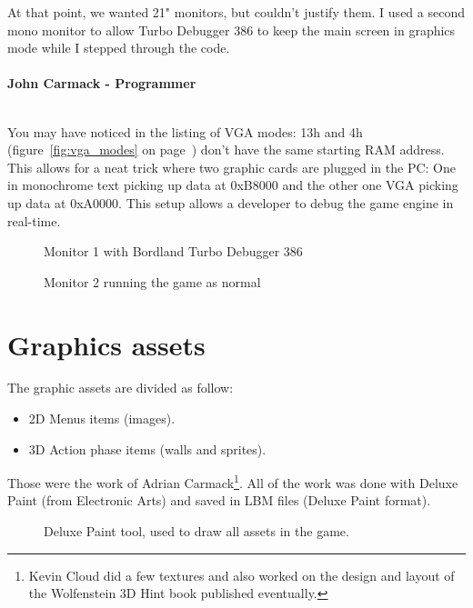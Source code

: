 \documentclass[book.tex]{subfiles}
\begin{document}
\begin{fancyquotes}
At that point, we wanted 21" monitors, but couldn't justify them.  I used a second mono monitor to allow Turbo Debugger 386 to keep the main screen in graphics mode while I stepped through the code.\\
 \\
\textbf{John Carmack - Programmer}
\end{fancyquotes}
\\
You may have noticed in the listing of VGA modes: 13h and 4h (figure~\ref{fig:vga_modes} on page~\pageref{fig:vga_modes})  don't have the same starting RAM address. This allows for a neat trick where two graphic cards are plugged in the PC: One in monochrome text picking up data at 0xB8000 and the other one VGA picking up data at 0xA0000. This setup allows a developer to debug the game engine in real-time.\\
\begin{figure}[H]
\centering
\caption{Monitor 1 with Bordland Turbo Debugger 386}
\label{fig:dm1}
\end{figure}

\begin{figure}[H]
\centering
\caption{Monitor 2 running the game as normal}
\label{fig:dm1}
\end{figure}



 
 
 




\section{Graphics assets}
The graphic assets are divided as follow:
\begin{itemize}
\item 2D Menus items (images).
\item 3D Action phase items (walls and sprites).
\end{itemize}
Those were the work of Adrian Carmack\footnote{Kevin Cloud did a few textures and also worked on the design and layout of the Wolfenstein 3D Hint book published eventually.}. All of the work was done with Deluxe Paint (from Electronic Arts) and saved in LBM files (Deluxe Paint format). 

\begin{figure}[H]
  \centering
 \caption{Deluxe Paint tool, used to draw all assets in the game.}
\end{figure}
\end{document}
